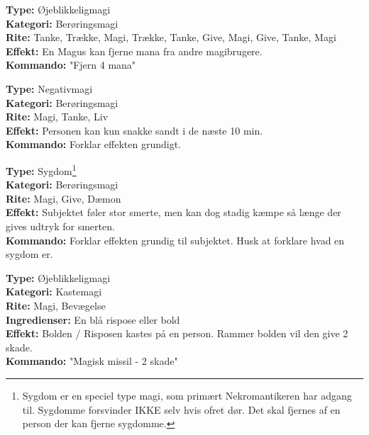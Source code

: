 \begin{lærmagi*}
\textbf{Type:} Øjeblikkeligmagi\\
\textbf{Kategori:} Berøringsmagi\\
\textbf{Rite:} Tanke, Trække, Magi, Trække, Tanke, Give, Magi, Give, Tanke, Magi\\
\textbf{Effekt:} En Magus kan fjerne mana fra andre magibrugere.\\
\textbf{Kommando:} "Fjern 4 mana"\\
\end{lærmagi*}

\begin{lærmagi*}[Sandhed]
\textbf{Type:} Negativmagi\\
\textbf{Kategori:} Berøringsmagi\\
\textbf{Rite:} Magi, Tanke, Liv\\
\textbf{Effekt:} Personen kan kun snakke sandt i de næste 10 min.\\
\textbf{Kommando:} Forklar effekten grundigt.\\
\end{lærmagi*}

\begin{lærmagi*}[Forrådnelse]
\textbf{Type:} Sygdom\footnote{Sygdom er en speciel type magi, som primært Nekromantikeren har adgang til. Sygdomme forsvinder IKKE selv hvis ofret dør. Det skal fjernes af en person der kan fjerne sygdomme.}\\
\textbf{Kategori:} Berøringsmagi\\
\textbf{Rite:} Magi, Give, Dæmon\\
\textbf{Effekt:} Subjektet føler stor smerte, men kan dog stadig kæmpe så længe der gives udtryk for smerten.\\
\textbf{Kommando:} Forklar effekten grundig til subjektet. Husk at forklare hvad en sygdom er.\\
\end{lærmagi*}

\begin{lærmagi*}
\textbf{Type:} Øjeblikkeligmagi\\
\textbf{Kategori:} Kastemagi\\
\textbf{Rite:} Magi, Bevægelse\\
\textbf{Ingredienser:} En blå rispose eller bold\\
\textbf{Effekt:} Bolden / Risposen kastes på en person. Rammer bolden vil den give 2 skade.\\
\textbf{Kommando:} "Magisk missil - 2 skade"\\
\end{lærmagi*}

